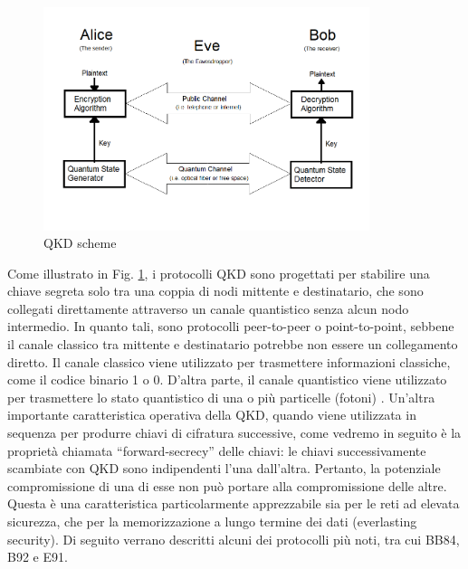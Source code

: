 \begin{figure}[H]
    \centering
    \includegraphics[width=0.85\textwidth]{MainContent/img/cap3/schema_QKD.png}
    \caption{QKD scheme}
    \label{fig:QKDscheme}
\end{figure}
\noindent
Come illustrato in Fig. \ref{fig:QKDscheme}, i protocolli QKD sono progettati per stabilire una chiave segreta solo tra una coppia di nodi mittente e destinatario, che sono collegati direttamente attraverso un canale quantistico senza alcun nodo intermedio. In quanto tali, sono protocolli peer-to-peer o point-to-point, sebbene il canale classico tra mittente e destinatario potrebbe non essere un collegamento diretto. Il canale classico viene utilizzato per trasmettere informazioni classiche, come il codice binario 1 o 0. D'altra parte, il canale quantistico viene utilizzato per trasmettere lo stato quantistico di una o più particelle (fotoni) \cite{yin_security_2016}.
Un’altra importante caratteristica operativa della QKD, quando viene utilizzata in sequenza per produrre chiavi di cifratura successive, come vedremo in seguito è la proprietà chiamata “forward-secrecy” delle chiavi: le chiavi successivamente scambiate con QKD sono indipendenti l’una dall’altra. Pertanto, la potenziale compromissione di una di esse non può portare alla compromissione delle altre. Questa è una caratteristica particolarmente apprezzabile sia per le reti ad elevata sicurezza, che per la memorizzazione a lungo termine dei dati (everlasting security).
Di seguito verrano descritti alcuni dei protocolli più noti, tra cui BB84, B92 e E91.
\newpage
